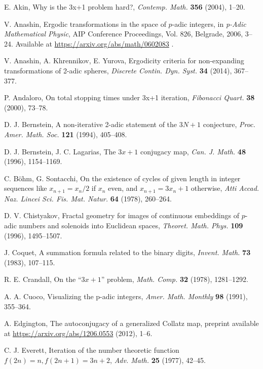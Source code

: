 \documentclass[12pt]{article}
\theoremstyle{definition}
\begin{document}
{{\begin{thebibliography}{99}
E. Akin,
Why is the 3x+1 problem hard?,
{\it Contemp. Math.} {\bf 356} (2004), 1--20.

V. Anashin, 
Ergodic transformations in the space of $p$-adic integers,
in {\it p-Adic Mathematical Physic}, AIP Conference Proceedings, Vol. 826, Belgrade, 2006, 3--24. Available at 
\url{https://arxiv.org/abs/math/0602083} .

V. Anashin, A. Khrennikov, E. Yurova,
Ergodicity criteria for non-expanding transformations of 2-adic spheres,
{\it Discrete Contin. Dyn. Syst.} {\bf 34} (2014), 367--377.

P. Andaloro, 
On total stopping times under 3x+1 iteration,
{\it Fibonacci Quart.} {\bf 38} (2000), 73--78.

D. J. Bernstein,
A non-iterative 2-adic statement of the $3N+ 1$ conjecture,
{\it Proc. Amer. Math. Soc.} {\bf 121} (1994), 405--408.

D. J. Bernstein, J. C. Lagarias,
The $3x+ 1$ conjugacy map,
{\it Can. J. Math.} {\bf 48} (1996), 1154--1169.

C. B\"{o}hm, G. Sontacchi,
On the existence of cycles of given length in integer sequences like $x_{n+1}= x_n/2$ if $x_n$ even, and $x_{n+1}= 3x_n+1$ otherwise,
{\it Atti Accad. Naz. Lincei Sci. Fis. Mat. Natur.} {\bf 64} (1978), 260--264.

D. V. Chistyakov, 
Fractal geometry for images of continuous embeddings of $p$-adic numbers and solenoids into Euclidean spaces,
{\it Theoret. Math. Phys.} {\bf 109} (1996), 1495--1507.

J. Coquet,
A summation formula related to the binary digits,
{\it Invent. Math.} {\bf 73} (1983), 107--115.

R. E. Crandall,
On the ``$3x+1$'' problem, 
{\it Math. Comp.} {\bf 32} (1978), 1281--1292.

A. A. Cuoco, 
Visualizing the p-adic integers,
{\it Amer. Math. Monthly} {\bf 98} (1991), 355--364.

A. Edgington, 
The autoconjugacy of a generalized Collatz map,
preprint available at \url{https://arxiv.org/abs/1206.0553} (2012), 1--6.

C. J. Everett,
Iteration of the number theoretic function $f(2n)=n, f(2n+1)=3n+2$,
{\it Adv. Math.} {\bf 25} (1977), 42--45.


\end{thebibliography}}}
\end{document}
